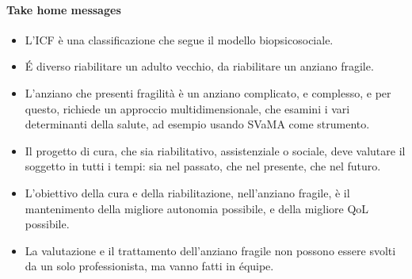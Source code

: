\paragraph{Take home messages}
\begin{itemize}
\item L'ICF è una classificazione che segue il modello biopsicosociale.
\item \'E diverso riabilitare un adulto vecchio, da riabilitare un anziano fragile.
\item L'anziano che presenti fragilità è un anziano complicato, e complesso, e
per questo, richiede un approccio multidimensionale, che esamini i vari
determinanti della salute, ad esempio usando SVaMA come strumento.
\item Il progetto di cura, che sia riabilitativo, assistenziale o sociale, deve
valutare il soggetto in tutti i tempi: sia nel passato, che nel presente, che
nel futuro.
\item L'obiettivo della cura e della riabilitazione, nell'anziano fragile, è il
mantenimento della migliore autonomia possibile, e della migliore QoL possibile.
\item La valutazione e il trattamento dell'anziano fragile non possono essere
svolti da un solo professionista, ma vanno fatti in équipe.
\end{itemize}
